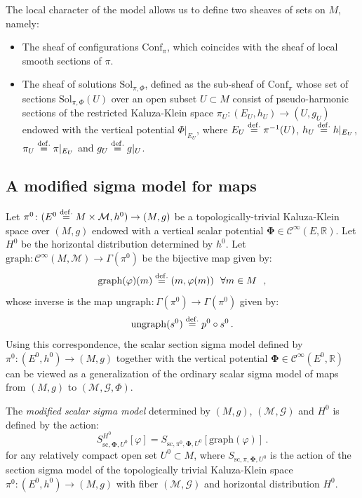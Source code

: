 \documentclass[10pt, cmp, numbook, final, a4paper]{svjour}
\newcommand{\eqdef}{\stackrel{{\rm def.}}{=}}
\def\R{\mathbb{R}}
\def\graph{\mathrm{graph}}
\def\ungraph{\mathrm{ungraph}}
\newcommand{\be}{\begin{equation*}}
\newcommand{\ee}{\end{equation*}}
\def\cC{{\mathcal C}}
\newcommand{\cM}{\mathcal{M}}
\def\cG{\mathcal{G}}
\def\cC{\mathcal{C}}
\def\bPhi{\mathbf{\Phi}}
\def\sc{\mathrm{sc}}
\def\Sol{\mathrm{Sol}}
\def\Conf{\mathrm{Conf}}
\begin{document}
The local character of the model allows us to define two sheaves of
sets on $M$, namely:

\begin{itemize}

\item The sheaf of configurations $\Conf_\pi$, which coincides with
  the sheaf of local smooth sections of $\pi$.

\item The sheaf of solutions $\Sol_{\pi,\Phi}$, defined as the
  sub-sheaf of $\Conf_\pi$ whose set of sections $\Sol_{\pi,\Phi}(U)$
  over an open subset $U\subset M$ consist of pseudo-harmonic sections
  of the restricted Kaluza-Klein space $\pi_U:(E_U,h_U)\rightarrow
  (U,g_U)$ endowed with the vertical potential $\Phi|_{E_U}$, where
  $E_U\eqdef \pi^{-1}(U)$, $h_U\eqdef h|_{E_U}$, $\pi_U\eqdef
  \pi|_{E_U}$ and $g_U\eqdef g|_{U}$.
\end{itemize}


\subsection{A modified sigma model for maps}

Let $\pi^0\colon (E^0\eqdef M\times \cM,h^0)\rightarrow (M,g)$ be a
topologically-trivial Kaluza-Klein space over $(M,g)$ endowed with a
vertical scalar potential $\bPhi\in \cC^\infty(E,\R)$. Let $H^0$ be
the horizontal distribution determined by $h^0$. Let
$\graph\colon \cC^\infty(M,\cM)\rightarrow \Gamma(\pi^0)$ be the
bijective map given by:
\be
\graph(\varphi)(m)\eqdef (m,\varphi(m))~~\forall m\in M~~,
\ee
whose inverse is the map $\ungraph:\Gamma(\pi^0)\rightarrow \Gamma(\pi^0)$ given by:
\be
\ungraph(s^0)\eqdef p^0\circ s^0\, .
\ee
Using this correspondence, the scalar section sigma model defined by
$\pi^0\colon (E^0,h^0)\rightarrow (M,g)$ together with the vertical
potential $\bPhi\in \cC^\infty(E^0,\R)$ can be viewed as a
generalization of the ordinary scalar sigma model of maps from $(M,g)$
to $(\cM,\cG,\Phi)$.
	
\begin{definition}
The {\em modified scalar sigma model} determined by $(M,g)$,
$(\cM,\cG)$ and $H^0$ is defined by the action:
\be
S^{H^0}_{\sc,\bPhi, U^0}[\varphi]=S_{\sc,\pi^0, \bPhi, U^0}[\graph(\varphi)]\, .
\ee
for any relatively compact open set $U^0\subset M$, where
$S_{\sc, \pi, \bPhi, U^0}$ is the action of the section sigma model of
the topologically trivial Kaluza-Klein space $\pi^0\colon
(E^0,h^0)\rightarrow (M,g)$ with fiber $(\cM,\cG)$ and horizontal
distribution $H^0$.
\end{definition}
\end{document}
